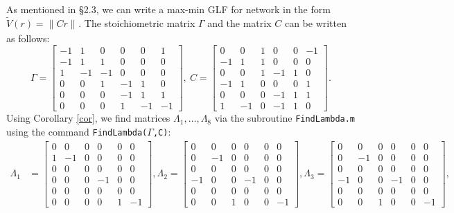 \documentclass[onefignum,onetabnum]{siamonline220329}
\newcommand{\tV}{{\widetilde{V}}}
\def\infty{}%
\begin{document}
{	As mentioned in \S 2.3, we can write a max-min GLF for network in the form $\tV(r)=\|Cr\|_{\infty}$. The stoichiometric matrix $\Gamma$ and the matrix $C$ can be written as follows:
	{\tiny \[ \Gamma=    \left[ \begin{array}{rrrrrr} -1 & 1 & 0 & 0 & 0 & 1\\ -1 & 1 & 1 & 0 & 0 & 0\\ 1 & -1 & -1 & 0 & 0 & 0\\ 0 & 0 & 1 & -1 & 1 & 0\\ 0 & 0 & 0 & -1 & 1 & 1\\ 0 & 0 & 0 & 1 & -1 & -1 \end{array}\right], ~ C=    \left[\begin{array}{rrrrrr} 0 & 0 & 1 & 0 & 0 & -1\\ -1 & 1 & 1 & 0 & 0 & 0\\ 0 & 0 & 1 & -1 & 1 & 0\\ -1 & 1 & 0 & 0 & 0 & 1\\ 0 & 0 & 0 & -1 & 1 & 1\\ 1 & -1 & 0 & -1 & 1 & 0 \end{array}\right].
	\]}
Using Corollary \ref{cor}, we find matrices $\Lambda_1,\dots,\Lambda_8$ via the subroutine \texttt{FindLambda.m} {using the command \texttt{FindLambda($\Gamma$,C)}}:
{\tiny 
\begin{align*}
\Lambda_1&=\left[\begin{array}{cccccc} 0 & 0 & 0 & 0 & 0 & 0\\ 1 & -1 & 0 & 0 & 0 & 0\\ 0 & 0 & 0 & 0 & 0 & 0\\ 0 & 0 & 0 & -1 & 0 & 0\\ 0 & 0 & 0 & 0 & 0 & 0\\ 0 & 0 & 0 & 0 & 1 & -1 \end{array}\right],
\Lambda_2=\left[\begin{array}{cccccc} 0 & 0 & 0 & 0 & 0 & 0\\ 0 & -1 & 0 & 0 & 0 & 0\\ 0 & 0 & 0 & 0 & 0 & 0\\ -1 & 0 & 0 & -1 & 0 & 0\\ 0 & 0 & 0 & 0 & 0 & 0\\ 0 & 0 & 1 & 0 & 0 & -1 \end{array}\right],
\Lambda_3=\left[\begin{array}{cccccc} 0 & 0 & 0 & 0 & 0 & 0\\ 0 & -1 & 0 & 0 & 0 & 0\\ 0 & 0 & 0 & 0 & 0 & 0\\ -1 & 0 & 0 & -1 & 0 & 0\\ 0 & 0 & 0 & 0 & 0 & 0\\ 0 & 0 & 1 & 0 & 0 & -1 \end{array}\right], \\

\end{align*}}}
\end{document}
